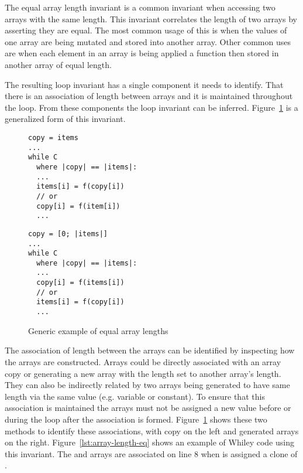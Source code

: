 The equal array length invariant is a common invariant when accessing two
arrays with the same length.
This invariant correlates the length of two arrays by asserting they are equal.
The most common usage of this is when the values of one array are being mutated
and stored into another array.
Other common uses are when each element in an array is being applied
a function then stored in another array of equal length.

The resulting loop invariant has a single component it needs to identify.
That there is an association of length between arrays and it is maintained
throughout the loop.
From these components the loop invariant can be inferred.
Figure~\ref{lst:equal-array-length-gen} is a generalized form
of this invariant.


\begin{figure}[ht]
\noindent
\begin{minipage}{.45\textwidth}
\begin{lstlisting}
copy = items
...
while C
  where |copy| == |items|:
  ...
  items[i] = f(copy[i])
  // or
  copy[i] = f(item[i])
  ...
\end{lstlisting}
\end{minipage}\hfill
\begin{minipage}{.45\textwidth}
\begin{lstlisting}
copy = [0; |items|]
...
while C
  where |copy| == |items|:
  ...
  copy[i] = f(items[i])
  // or
  items[i] = f(copy[i])
  ...
\end{lstlisting}
\end{minipage}
\caption{Generic example of equal array lengths}
\label{lst:equal-array-length-gen}
\end{figure}

The association of length between the arrays can be identified by inspecting 
how the arrays are constructed.
Arrays could be directly associated with an array copy or generating
a new array with the length set to another array's length.
They can also be indirectly related by two arrays being generated
to have same length via the same value (e.g. variable or constant).
To ensure that this association is maintained the arrays must not 
be assigned a new value before or during the loop after the association
is formed.
Figure~\ref{lst:equal-array-length-gen} shows these two methods to
identify these associations, with copy on the left and generated 
arrays on the right.
Figure~\ref{lst:array-length-eq} shows an example of 
Whiley code using this invariant.
The  and  arrays are associated on line
8 when  is assigned a clone of . 

